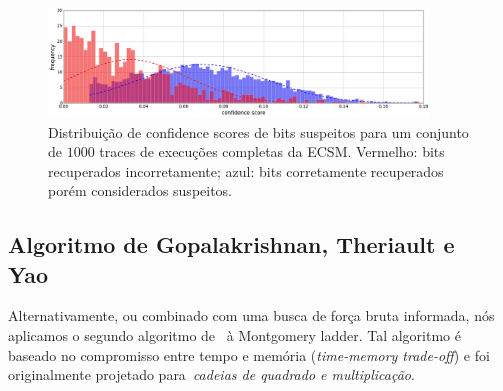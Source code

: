\begin{figure}[h!tb]
	\centering   %
	\includegraphics[width=0.9\textwidth]{figures/SAC_2016__pointer_cswap_attack__hist-conf-all-traces__n_trset_40.png}
	\caption{
	Distribuição de confidence scores de bits suspeitos para um conjunto de $1000$ traces de execuções completas da ECSM. Vermelho: bits recuperados incorretamente; azul: bits corretamente recuperados porém considerados suspeitos.
	}
	\vspace{.5mm}
	\label{fig:hist-conf-all-traces__n_trset_40}
\end{figure}

\subsection{Algoritmo de Gopalakrishnan, Theriault e Yao~\cite{GopalakrishnanTheriaultYao07}} %

Alternativamente, ou combinado com uma busca de força bruta informada, nós aplicamos o segundo algoritmo de~\cite{Gopalakrishnan2007} à Montgomery ladder. Tal algoritmo é baseado no compromisso entre tempo e memória (\textit{time-memory trade-off}) e foi originalmente projetado para~\textit{cadeias de quadrado e multiplicação}.


